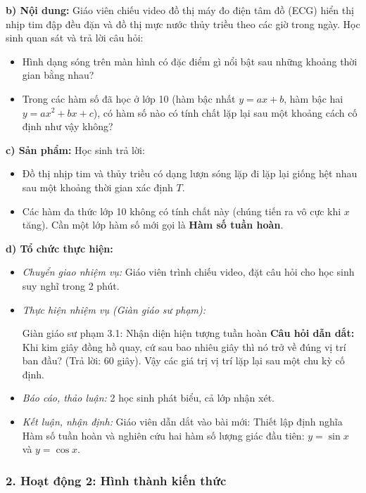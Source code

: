 \documentclass[12pt, a4paper]{article}
\begin{document}
\textbf{b) Nội dung:} Giáo viên chiếu video đồ thị máy đo điện tâm đồ (ECG) hiển thị nhịp tim đập đều đặn và đồ thị mực nước thủy triều theo các giờ trong ngày. Học sinh quan sát và trả lời câu hỏi:
\begin{itemize}[leftmargin=0.6cm]
    \item Hình dạng sóng trên màn hình có đặc điểm gì nổi bật sau những khoảng thời gian bằng nhau?
    \item Trong các hàm số đã học ở lớp 10 (hàm bậc nhất $y = ax + b$, hàm bậc hai $y = ax^2 + bx + c$), có hàm số nào có tính chất lặp lại sau một khoảng cách cố định như vậy không?
\end{itemize}

\textbf{c) Sản phẩm:} Học sinh trả lời:
\begin{itemize}[leftmargin=0.6cm]
    \item Đồ thị nhịp tim và thủy triều có dạng lượn sóng lặp đi lặp lại giống hệt nhau sau một khoảng thời gian xác định $T$.
    \item Các hàm đa thức lớp 10 không có tính chất này (chúng tiến ra vô cực khi $x$ tăng). Cần một lớp hàm số mới gọi là \textbf{Hàm số tuần hoàn}.
\end{itemize}

\textbf{d) Tổ chức thực hiện:}
\begin{itemize}[leftmargin=0.6cm]
    \item \textit{Chuyển giao nhiệm vụ:} Giáo viên trình chiếu video, đặt câu hỏi cho học sinh suy nghĩ trong 2 phút.
    \item \textit{Thực hiện nhiệm vụ (Giàn giáo sư phạm):}
    \begin{scaffoldbox}{Giàn giáo sư phạm 3.1: Nhận diện hiện tượng tuần hoàn}
        \textbf{Câu hỏi dẫn dắt:} Khi kim giây đồng hồ quay, cứ sau bao nhiêu giây thì nó trở về đúng vị trí ban đầu? (Trả lời: 60 giây). Vậy các giá trị vị trí lặp lại sau một chu kỳ cố định.
    \end{scaffoldbox}
    \item \textit{Báo cáo, thảo luận:} 2 học sinh phát biểu, cả lớp nhận xét.
    \item \textit{Kết luận, nhận định:} Giáo viên dẫn dắt vào bài mới: Thiết lập định nghĩa Hàm số tuần hoàn và nghiên cứu hai hàm số lượng giác đầu tiên: $y = \sin x$ và $y = \cos x$.
\end{itemize}

\subsubsection*{2. Hoạt động 2: Hình thành kiến thức}
\end{document}
